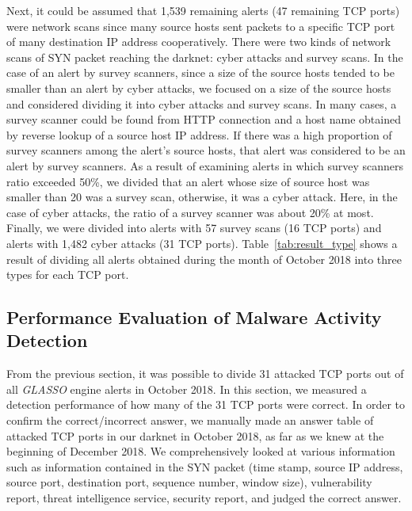 \documentclass[conference]{IEEEtran}
\begin{document}
Next, it could be assumed that 1,539 remaining alerts (47 remaining TCP ports) were network scans since many source hosts sent packets to a specific TCP port of many destination IP address cooperatively.
There were two kinds of network scans of SYN packet reaching the darknet: cyber attacks and survey scans.
In the case of an alert by survey scanners, since a size of the source hosts tended to be smaller than an alert by cyber attacks, we focused on a size of the source hosts and considered dividing it into cyber attacks and survey scans.
In many cases, a survey scanner could be found from HTTP connection and a host name obtained by reverse lookup of a source host IP address.
If there was a high proportion of survey scanners among the alert's source hosts, that alert was considered to be an alert by survey scanners.
As a result of examining alerts in which survey scanners ratio exceeded 50\%, we divided that an alert whose size of source host was smaller than 20 was a survey scan, otherwise, it was a cyber attack.
Here, in the case of cyber attacks, the ratio of a survey scanner was about 20\% at most.
Finally, we were divided into alerts with 57 survey scans (16 TCP ports) and alerts with 1,482 cyber attacks (31 TCP ports).
Table~\ref{tab:result_type} shows a result of dividing all alerts obtained during the month of October 2018 into three types for each TCP port.







\subsection{Performance Evaluation of Malware Activity Detection}
From the previous section, it was possible to divide 31 attacked TCP ports out of all {\it GLASSO} engine alerts in October 2018.
In this section, we measured a detection performance of how many of the 31 TCP ports were correct.
In order to confirm the correct/incorrect answer, we manually made an answer table of attacked TCP ports in our darknet in October 2018, as far as we knew at the beginning of December 2018.
We comprehensively looked at various information such as information contained in the SYN packet (time stamp, source IP address, source port, destination port, sequence number, window size), vulnerability report, threat intelligence service, security report, and judged the correct answer.
\end{document}
